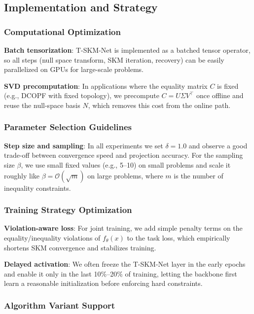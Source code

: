 \documentclass[letterpaper]{article} %
\begin{document}
\subsection{Implementation and Strategy}

\subsubsection{Computational Optimization}

\textbf{Batch tensorization}: T-SKM-Net is implemented as a batched tensor operator, so all steps (null space transform, SKM iteration, recovery) can be easily parallelized on GPUs for large-scale problems.

\textbf{SVD precomputation}: In applications where the equality matrix $C$ is fixed (e.g., DCOPF with fixed topology), we precompute $C = U\Sigma V^\top$ once offline and reuse the null-space basis $N$, which removes this cost from the online path.

\subsubsection{Parameter Selection Guidelines}

\textbf{Step size and sampling}: In all experiments we set $\delta=1.0$ and observe a good trade-off between convergence speed and projection accuracy. For the sampling size $\beta$, we use small fixed values (e.g., 5–10) on small problems and scale it roughly like $\beta = \mathcal{O}(\sqrt{m})$ on large problems, where $m$ is the number of inequality constraints.

\subsubsection{Training Strategy Optimization}

\textbf{Violation-aware loss}: For joint training, we add simple penalty terms on the equality/inequality violations of $f_\theta(x)$ to the task loss, which empirically shortens SKM convergence and stabilizes training.

\textbf{Delayed activation}: We often freeze the T-SKM-Net layer in the early epochs and enable it only in the last 10\%–20\% of training, letting the backbone first learn a reasonable initialization before enforcing hard constraints.

\subsubsection{Algorithm Variant Support}
\end{document}
